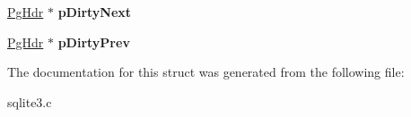 \begin{DoxyCompactItemize}
\item 
\hyperlink{structPgHdr}{Pg\+Hdr} $\ast$ {\bfseries p\+Dirty\+Next}\hypertarget{structPgHdr_a61b56eb694ce445799963f7eb912e367}{}\label{structPgHdr_a61b56eb694ce445799963f7eb912e367}

\item 
\hyperlink{structPgHdr}{Pg\+Hdr} $\ast$ {\bfseries p\+Dirty\+Prev}\hypertarget{structPgHdr_a8392b45bb05d88c734020beb912304dc}{}\label{structPgHdr_a8392b45bb05d88c734020beb912304dc}

\end{DoxyCompactItemize}


The documentation for this struct was generated from the following file\+:\begin{DoxyCompactItemize}
\item 
sqlite3.\+c\end{DoxyCompactItemize}
